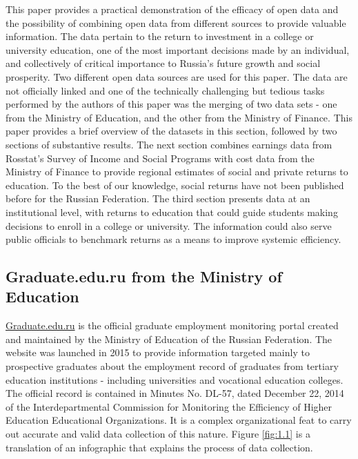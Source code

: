 \documentclass[alpha-refs]{wiley-article-05g}
\begin{document}
This paper provides a practical demonstration of the efficacy of open data 
and the possibility of combining open data from different sources to 
provide valuable information. The data pertain to the return to investment 
in a college or university education, one of the most important decisions 
made by an individual, and collectively of critical importance to Russia's 
future growth and social prosperity. Two different open data sources are 
used for this paper. The data are not officially linked and one of the 
technically challenging but tedious tasks performed by the authors of this 
paper was the merging of two data sets - one from the Ministry of 
Education, and the other from the Ministry of Finance. This paper provides 
a brief overview of the datasets in this section, followed by two sections 
of substantive results. The next section combines earnings data from 
Rosstat's Survey of Income and Social Programs with cost data from the 
Ministry of Finance to provide regional estimates of social and private 
returns to education. To the best of our knowledge, social returns have not 
been published before for the Russian Federation. The third section 
presents data at an institutional level, with returns to education that 
could guide students making decisions to enroll in a college or university. 
The information could also serve public officials to benchmark returns as a 
means to improve systemic efficiency. 

\subsection{Graduate.edu.ru from the Ministry of Education}

\url{Graduate.edu.ru} is the official graduate employment monitoring portal 
created and maintained by the Ministry of Education of the Russian 
Federation. The website was launched in 2015 to provide information 
targeted mainly to prospective graduates about the employment record of 
graduates from tertiary education institutions - including universities and 
vocational education colleges. The official record is contained in Minutes 
No. DL-57, dated December 22, 2014 of the Interdepartmental Commission for 
Monitoring the Efficiency of Higher Education Educational Organizations. It 
is a complex organizational feat to carry out accurate and valid data 
collection of this nature. Figure \ref{fig:1.1} is a translation of an 
infographic that explains the process of data collection. 

\vspace{0.5em}
\end{document}
